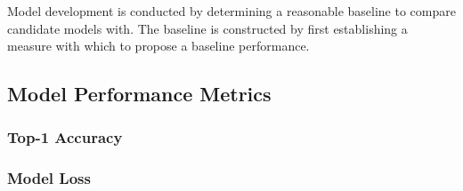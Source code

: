 Model development is conducted by determining a reasonable baseline to compare candidate models with.
The baseline is constructed by first establishing a measure with which to propose a baseline performance.

\subsection{Model Performance Metrics}\label{sec:MPM}
\subsubsection{Top-1 Accuracy}

\subsubsection{Model Loss}
